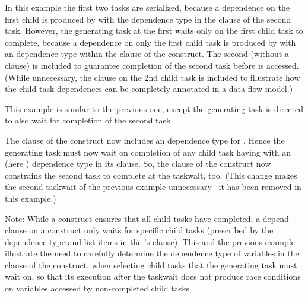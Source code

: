 

In this example the first two tasks are serialized, because a dependence on
the first child is produced by  with the  dependence type
in the  clause of the second task.
However, the generating task at the first  waits only on the
first child task to complete, because a dependence on only the first child task
is produced by  with an  dependence type within the
 clause of the  construct.
The second  (without a  clause) is included
to guarantee completion of the second task before  is accessed.
(While unnecessary, the  clause on the 2nd child task is
included to illustrate how the child task dependences can be completely annotated
in a data-flow model.)



\clearpage


This example is similar to the previous one, except the generating task is
directed to also wait for completion of the second task.

The  clause of the  construct now includes an
 dependence type for .  Hence the generating task must now
wait on completion of any child task having  with an 
(here ) dependence type in its  clause.
So, the  clause of the  construct now constrains
the second task to complete at the taskwait, too.
(This change makes the second taskwait of the previous example unnecessary--
it has been removed in this example.)

Note: While a  construct ensures that all child tasks have completed; a depend clause on a 
construct only waits for specific child tasks (prescribed by the dependence type and list
items in the 's  clause).
This and the previous example illustrate the need to carefully determine
the dependence type of variables in the  clause of the  construct.
when selecting child tasks that the generating task must wait on, so that its execution after the
taskwait does not produce race conditions on variables accessed by non-completed child tasks.

